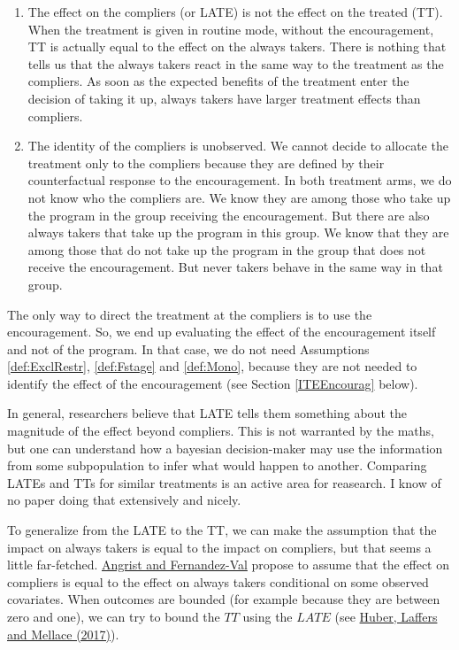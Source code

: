 \documentclass[
]{book}
\providecommand{\tightlist}{%
  \setlength{\itemsep}{0pt}\setlength{\parskip}{0pt}}
\theoremstyle{definition}
\theoremstyle{definition}
\theoremstyle{definition}
\theoremstyle{definition}
\theoremstyle{remark}
\begin{document}
\begin{enumerate}
\def\labelenumi{\arabic{enumi}.}
\tightlist
\item
  The effect on the compliers (or LATE) is not the effect on the treated (TT).
  When the treatment is given in routine mode, without the encouragement, TT is actually equal to the effect on the always takers.
  There is nothing that tells us that the always takers react in the same way to the treatment as the compliers.
  As soon as the expected benefits of the treatment enter the decision of taking it up, always takers have larger treatment effects than compliers.
\item
  The identity of the compliers is unobserved.
  We cannot decide to allocate the treatment only to the compliers because they are defined by their counterfactual response to the encouragement.
  In both treatment arms, we do not know who the compliers are.
  We know they are among those who take up the program in the group receiving the encouragement.
  But there are also always takers that take up the program in this group.
  We know that they are among those that do not take up the program in the group that does not receive the encouragement.
  But never takers behave in the same way in that group.
\end{enumerate}

The only way to direct the treatment at the compliers is to use the encouragement.
So, we end up evaluating the effect of the encouragement itself and not of the program.
In that case, we do not need Assumptions \ref{def:ExclRestr}, \ref{def:Fstage} and \ref{def:Mono}, because they are not needed to identify the effect of the encouragement (see Section \ref{ITEEncourag} below).

In general, researchers believe that LATE tells them something about the magnitude of the effect beyond compliers.
This is not warranted by the maths, but one can understand how a bayesian decision-maker may use the information from some subpopulation to infer what would happen to another.
Comparing LATEs and TTs for similar treatments is an active area for reasearch.
I know of no paper doing that extensively and nicely.

To generalize from the LATE to the TT, we can make the assumption that the impact on always takers is equal to the impact on compliers, but that seems a little far-fetched.
\href{https://www.nber.org/papers/w16566}{Angrist and Fernandez-Val} propose to assume that the effect on compliers is equal to the effect on always takers conditional on some observed covariates.
When outcomes are bounded (for example because they are between zero and one), we can try to bound the \(TT\) using the \(LATE\) (see \href{https://onlinelibrary.wiley.com/doi/abs/10.1002/jae.2473}{Huber, Laffers and Mellace (2017)}).
\end{document}
